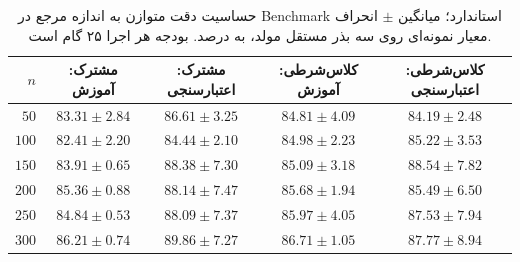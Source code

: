 \begin{table}[htbp]
\centering\small
\caption{حساسیت دقت متوازن به اندازه مرجع در Benchmark استاندارد؛ میانگین $\pm$ انحراف معیار نمونه‌ای روی سه بذر مستقل مولد، به درصد. بودجه هر اجرا ۲۵ گام  است.}
\label{tab:ch4-margin-train-size}
\begin{tabular}{rcccc}\hline
$n$ & مشترک: آموزش & مشترک: اعتبارسنجی & کلاس‌شرطی: آموزش & کلاس‌شرطی: اعتبارسنجی\\\hline
$50$ & $83.31\pm2.84$ & $86.61\pm3.25$ & $84.81\pm4.09$ & $84.19\pm2.48$\\
$100$ & $82.41\pm2.20$ & $84.44\pm2.10$ & $84.98\pm2.23$ & $85.22\pm3.53$\\
$150$ & $83.91\pm0.65$ & $88.38\pm7.30$ & $85.09\pm3.18$ & $88.54\pm7.82$\\
$200$ & $85.36\pm0.88$ & $88.14\pm7.47$ & $85.68\pm1.94$ & $85.49\pm6.50$\\
$250$ & $84.84\pm0.53$ & $88.09\pm7.37$ & $85.97\pm4.05$ & $87.53\pm7.94$\\
$300$ & $86.21\pm0.74$ & $89.86\pm7.27$ & $86.71\pm1.05$ & $87.77\pm8.94$\\
\hline
\end{tabular}
\end{table}
